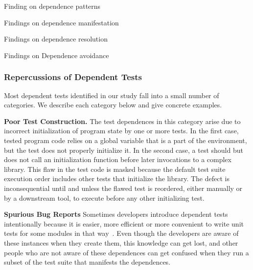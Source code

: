 Finding on dependence patterns

Findings on dependence manifestation

Findings on dependence resolution

Findings on Dependence avoidance



\subsubsection{Repercussions of Dependent Tests}

Most dependent tests identified in our study fall into a small
number of categories. We describe each category below and give
concrete examples. 

\vspace{1mm}

\noindent \textbf{Poor Test Construction.}
The test dependences in this category arise due to incorrect initialization
of program state by one or more tests. In the first case,
tested program code relies on a
global variable that is a part of the environment, but the test does
not properly initialize it.  In the second case, a test should but
does not call
an initialization function before later invocations to a complex library.
This flaw in the test code is masked because the default test suite execution
order includes other tests that initialize the library.  The defect is
inconsequential until and unless the flawed test is reordered, either manually or by
a downstream tool, to execute before any other initializing test.

\vspace{1mm}

\noindent \textbf{Spurious Bug Reports}
Sometimes developers introduce dependent tests intentionally because it is
easier, more efficient or more convenient to write unit tests for some modules
in that way~\cite{kapfhammeretal:FSE:2003, whittakeretal:2012}.
Even though the developers are aware of these instances
when they create them, this knowledge can get lost, 
and other people who are not aware of these dependences can get confused 
when they run a subset of the test suite that manifests the
dependences.

